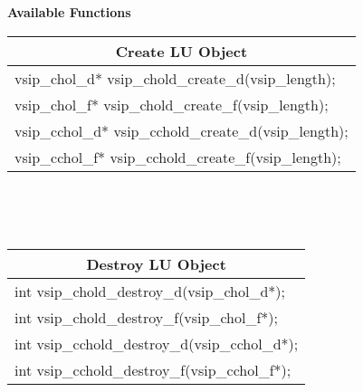 \\\cvsiplh 
\\ \hspace*{.8cm} \vspace*{.1cm} \textbf{Available Functions }
%
\\ \hspace*{1.cm} {
\ttfamily\vspace{.3cm}
\begin{tabular}[H]{|l|}
\multicolumn{1}{c}{\rmfamily \bfseries Create LU Object\vspace{.1cm}}\\ \hline
vsip\_chol\_d* vsip\_chold\_create\_d(vsip\_length);\\
vsip\_chol\_f* vsip\_chold\_create\_f(vsip\_length);\\
vsip\_cchol\_d* vsip\_cchold\_create\_d(vsip\_length);\\
vsip\_cchol\_f* vsip\_cchold\_create\_f(vsip\_length);\\
\hline\end{tabular}\\}
%
\\ \hspace*{1.cm} {
\ttfamily\vspace{.3cm}
\begin{tabular}[H]{|l|}
\multicolumn{1}{c}{\rmfamily \bfseries Destroy LU Object\vspace{.1cm}}\\ \hline
int vsip\_chold\_destroy\_d(vsip\_chol\_d*);\\
int vsip\_chold\_destroy\_f(vsip\_chol\_f*);\\
int vsip\_cchold\_destroy\_d(vsip\_cchol\_d*);\\
int vsip\_cchold\_destroy\_f(vsip\_cchol\_f*);\\
\hline\end{tabular}\\}
%
